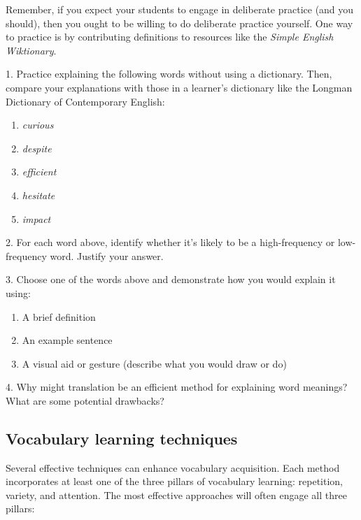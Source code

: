 Remember, if you expect your students to engage in deliberate practice (and you should), then you ought to be willing to do deliberate practice yourself. One way to practice is by contributing definitions to resources like the \textit{Simple English Wiktionary}.


\begin{tcolorbox}[title=Exercise: Explaining Word Meanings, colback=white, colframe=green!75!black, fonttitle=\bfseries]
1. Practice explaining the following words without using a dictionary. Then, compare your explanations with those in a learner's dictionary like the Longman Dictionary of Contemporary English:

\begin{enumerate}
   \item \textit{curious}
   \item \textit{despite}
   \item \textit{efficient}
   \item \textit{hesitate}
   \item \textit{impact}
\end{enumerate}

2. For each word above, identify whether it's likely to be a high-frequency or low-frequency word. Justify your answer.

3. Choose one of the words above and demonstrate how you would explain it using:
   \begin{enumerate}
      \item A brief definition
      \item An example sentence
      \item A visual aid or gesture (describe what you would draw or do)
   \end{enumerate}

4. Why might translation be an efficient method for explaining word meanings? What are some potential drawbacks?
\end{tcolorbox}

\newpage
\subsection{Vocabulary learning techniques}

Several effective techniques can enhance vocabulary acquisition. Each method incorporates at least one of the three pillars of vocabulary learning: repetition, variety, and attention. The most effective approaches will often engage all three pillars:


